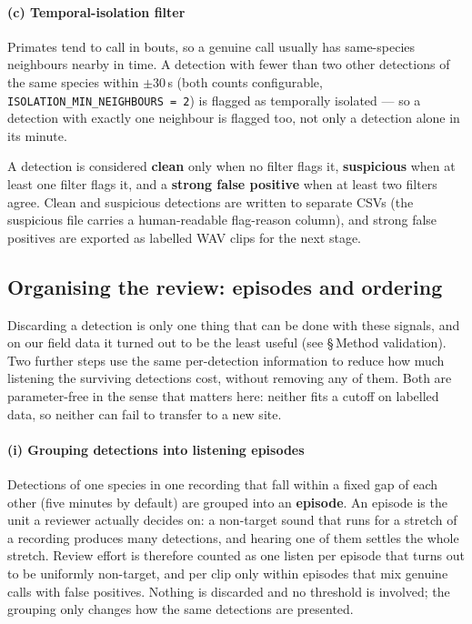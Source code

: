 \documentclass[review,3p,times]{elsarticle}
\begin{document}
\paragraph{(c) Temporal-isolation filter}
Primates tend to call in bouts, so a genuine call usually has same-species
neighbours nearby in time. A detection with fewer than two other detections of
the same species within $\pm$30\,s (both counts configurable,
\texttt{ISOLATION\_MIN\_NEIGHBOURS = 2}) is flagged as temporally isolated ---
so a detection with exactly one neighbour is flagged too, not only a detection
alone in its minute.

A detection is considered \textbf{clean} only when no filter flags it,
\textbf{suspicious} when at least one filter flags it, and a \textbf{strong
false positive} when at least two filters agree. Clean and suspicious
detections are written to separate CSVs (the suspicious file carries a
human-readable flag-reason column), and strong false positives are
exported as labelled WAV clips for the next stage.

\subsection*{Organising the review: episodes and ordering}

Discarding a detection is only one thing that can be done with these signals,
and on our field data it turned out to be the least useful (see
\S\,Method validation). Two further steps use the same per-detection
information to reduce how much listening the surviving detections cost, without
removing any of them. Both are parameter-free in the sense that matters here:
neither fits a cutoff on labelled data, so neither can fail to transfer to a
new site.

\paragraph{(i) Grouping detections into listening episodes}
Detections of one species in one recording that fall within a fixed gap of each
other (five minutes by default) are grouped into an \textbf{episode}. An
episode is the unit a reviewer actually decides on: a non-target sound that
runs for a stretch of a recording produces many detections, and hearing one of
them settles the whole stretch. Review effort is therefore counted as one
listen per episode that turns out to be uniformly non-target, and per clip only
within episodes that mix genuine calls with false positives. Nothing is
discarded and no threshold is involved; the grouping only changes how the same
detections are presented.
\end{document}
